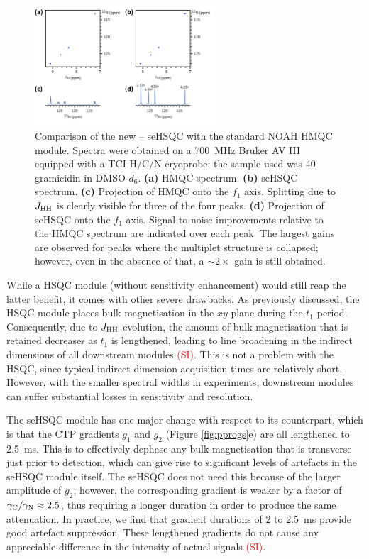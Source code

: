 \documentclass[11pt]{article}
\newcommand*{\carbon}{\ce{^{13}C}}
\newcommand*{\proton}{\ce{^{1}H}}
\newcommand*{\nitrogen}{\ce{^{15}N}}
\newcommand*{\red}[1]{\textcolor{red}{#1}}
\newcommand*{\jhh}{J_{\ce{HH}}}
\newcommand*{\figref}[1]{Figure \ref{fig:#1}}
\newcommand*{\sitodo}{\red{(SI)}}
\begin{document}
\begin{figure}[H]
    \centering
    \includegraphics[width=0.6\textwidth]{./figures/15n_spv2vsm.png}
    \caption{
        Comparison of the new \nitrogen{}--\proton{} seHSQC with the standard NOAH HMQC module.
        Spectra were obtained on a \SI{700}{\MHz} Bruker AV III equipped with a TCI H/C/N cryoprobe; the sample used was \SI{40}{\milli\molar} gramicidin in DMSO-$d_6$.
        \textbf{(a)} HMQC spectrum.
        \textbf{(b)} seHSQC spectrum.
        \textbf{(c)} Projection of HMQC onto the $f_1$ axis.
        Splitting due to $\jhh$ is clearly visible for three of the four peaks.
        \textbf{(d)} Projection of seHSQC onto the $f_1$ axis.
        Signal-to-noise improvements relative to the HMQC spectrum are indicated over each peak.
        The largest gains are observed for peaks where the multiplet structure is collapsed; however, even in the absence of that, a $\sim 2\times$ gain is still obtained.
    }
    \label{fig:n15}
\end{figure}

While a \nitrogen{} HSQC module (without sensitivity enhancement) would still reap the latter benefit, it comes with other severe drawbacks.
As previously discussed, the HSQC module places bulk magnetisation in the $xy$-plane during the $t_1$ period.
Consequently, due to $\jhh$ evolution, the amount of bulk magnetisation that is retained decreases as $t_1$ is lengthened, leading to line broadening in the indirect dimensions of all downstream modules \sitodo{}.
This is not a problem with the \carbon{} HSQC, since typical \carbon{} indirect dimension acquisition times are relatively short.
However, with the smaller spectral widths in \nitrogen{} experiments, downstream modules can suffer substantial losses in sensitivity and resolution.

The \nitrogen{} seHSQC module has one major change with respect to its \carbon{} counterpart, which is that the CTP gradients $g_1$ and $g_2$ (\figref{pprogs}e) are all lengthened to \SI{2.5}{\ms}.
This is to effectively dephase any bulk magnetisation that is transverse just prior to detection, which can give rise to significant levels of artefacts in the seHSQC module itself.
The \carbon{} seHSQC does not need this because of the larger amplitude of $g_2$; however, the corresponding \nitrogen{} gradient is weaker by a factor of $\gamma_{\ce{C}}/\gamma_{\ce{N}} \approx 2.5$, thus requiring a longer duration in order to produce the same attenuation.
In practice, we find that gradient durations of 2 to \SI{2.5}{\ms} provide good artefact suppression.
These lengthened gradients do not cause any appreciable difference in the intensity of actual signals \sitodo{}.
\end{document}
